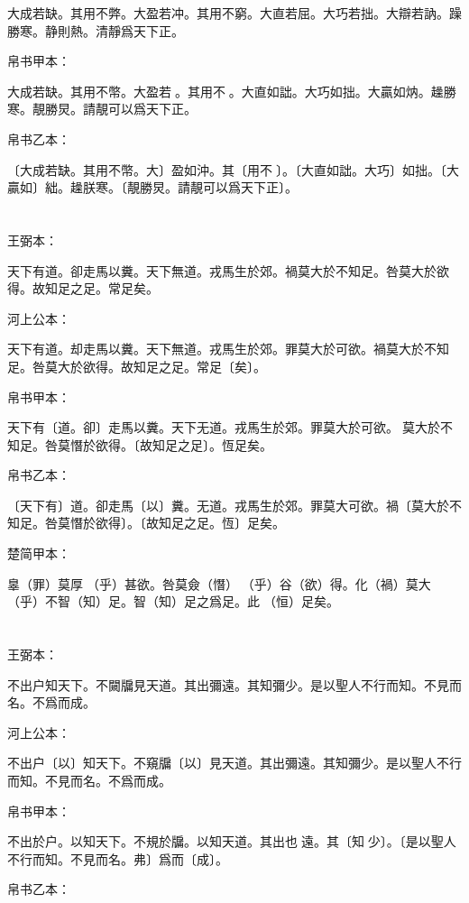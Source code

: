 \documentclass[a5paper]{ctexbook}
\begin{document}
    大成若缺。其用不弊。大盈若冲。其用不窮。大直若屈。大巧若拙。大辯若訥。躁勝寒。静則熱。清靜爲天下正。

    帛书甲本：

    大成若缺。其用不幣。大盈若𥁵。其用不𡩫。大直如詘。大巧如拙。大贏如㶧。趮勝寒。靚勝炅。請靚可以爲天下正。

    帛书乙本：

    〔大成若缺。其用不幣。大〕盈如沖。其〔用不𡩫〕。〔大直如詘。大巧〕如拙。〔大贏如〕絀。趮朕寒。〔靚勝炅。請靚可以爲天下正〕。

    \chapter{}
    王弼本：

    天下有道。卻走馬以糞。天下無道。戎馬生於郊。禍莫大於不知足。咎莫大於欲得。故知足之足。常足矣。

    河上公本：

    天下有道。却走馬以糞。天下無道。戎馬生於郊。罪莫大於可欲。禍莫大於不知足。咎莫大於欲得。故知足之足。常足〔矣〕。

    帛书甲本：

    天下有〔道。卻〕走馬以糞。天下无道。戎馬生於郊。罪莫大於可欲。𢢸莫大於不知足。咎莫憯於欲得。〔故知足之足〕。恆足矣。

    帛书乙本：

    〔天下有〕道。卻走馬〔以〕糞。无道。戎馬生於郊。罪莫大可欲。禍〔莫大於不知足。咎莫憯於欲得〕。〔故知足之足。恆〕足矣。

    楚简甲本：

    辠（罪）莫厚󶴋（乎）甚欲。咎莫僉（憯）󶴋（乎）谷（欲）得。化（禍）莫大󶴋（乎）不智（知）足。智（知）足之爲足。此𠄨（恒）足矣。

    \chapter{}
    王弼本：

    不出户知天下。不闚牖見天道。其出彌遠。其知彌少。是以聖人不行而知。不見而名。不爲而成。

    河上公本：

    不出户〔以〕知天下。不窺牖〔以〕見天道。其出彌遠。其知彌少。是以聖人不行而知。不見而名。不爲而成。

    帛书甲本：

    不出於户。以知天下。不規於牖。以知天道。其出也𢑃遠。其〔知󱁁少〕。〔是以聖人不行而知。不見而名。弗〕爲而〔成〕。

    帛书乙本：
\end{document}
